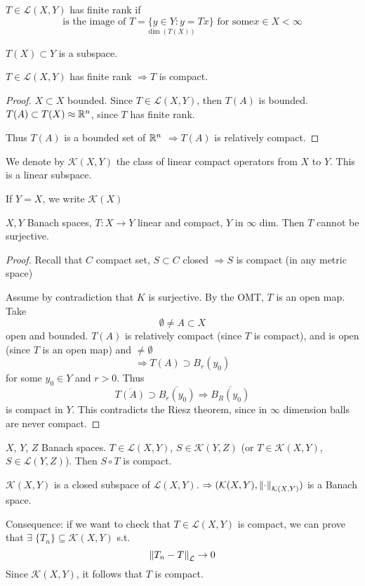 \begin{definition}
    \(T \in \mathcal{L}(X, Y)\) has finite rank if 
    \[
        \underset{\dim (T(X))}{\text{is the image of }T= \{y \in Y: y = Tx\} \text{ for some} x \in X} < \infty
    \]
\end{definition}
\(T(X) \subset Y\) is a subspace.
\begin{proposition}
    \(T \in \mathcal{L}(X, Y)\) has finite rank \(\Rightarrow T\) is compact.
\end{proposition}
\begin{proof}
    \(X \subset X \) bounded. Since \(T \in \mathcal{L}(X, Y)\), then \(T(A)\) is bounded. \(T(A) \subset T(X) \approx \mathbb{R}^n\), since \(T\) has finite rank. 
    
    Thus \(T(A)\) is a bounded set of \(\mathbb{R}^n\) \(\Rightarrow T(A) \) is relatively compact. 
\end{proof}

\begin{definition}
    We denote by \(\mathcal{K}(X, Y)\) the class of linear compact operators from \(X \) to \(Y\). This is a linear subspace.

    If \(Y=X\), we write \(\mathcal{K}(X)\)
\end{definition}
\begin{proposition}
    \(X, Y\) Banach spaces, \(T:X \to Y\) linear and compact, \(Y\) in \(\infty\) dim. Then \(T\) cannot be surjective.
\end{proposition}
\begin{proof}
    Recall that \(C\) compact set, \(S \subset C\) closed \(\Rightarrow S\) is compact (in any metric space)

    Assume by contradiction that \(K\) is surjective. By the OMT, \(T\) is an open map. Take 
    \[
        \emptyset \neq A \subset X
    \]
    open and bounded. \(T(A)\) is relatively compact (since \(T\) is compact), and is open (since \(T\) is an open map) 
    and \(\neq \emptyset\)
    \[
        \Rightarrow T(A) \supset B_r(y_0)
    \]
    for some \(y_0 \in Y \) and \(r>0\). Thus 
    \[
        \overline{T(A)} \supset \overline{B_r(y_0)} \Rightarrow \overline{B_R(y_0)} 
    \] 
    is compact in \(Y\). This contradicts the Riesz theorem, since in \(\infty\) dimension balls are never compact. 
\end{proof}

\begin{proposition}
    \(X\), \(Y\), \(Z\) Banach spaces. \(T \in \mathcal{L}(X, Y)\), \(S \in \mathcal{K}(Y, Z)\) (or \(T \in \mathcal{K}(X, Y)\), \(S \in \mathcal{L}(Y, Z)\)). Then \(S \circ T\) is compact.
\end{proposition}
\begin{theorem}
    \(\mathcal{K}(X, Y) \) is a closed subspace of \(\mathcal{L}(X, Y)\). \(\Rightarrow (\mathcal{K}(X, Y), \norm{\cdot}_{\mathcal{K}(X, Y)})\) is a Banach space.
\end{theorem}
Consequence: if we want to check that \(T \in \mathcal{L}(X, Y)\) is compact, we can prove that \(\exists\; \{T_n\} \subseteq \mathcal{K}(X, Y)\) s.t. 
\[
    \norm{T_n - T}_{\mathcal{L}} \to 0
\]
Since \(\mathcal{K}(X, Y)\), it follows that \(T\) is compact.